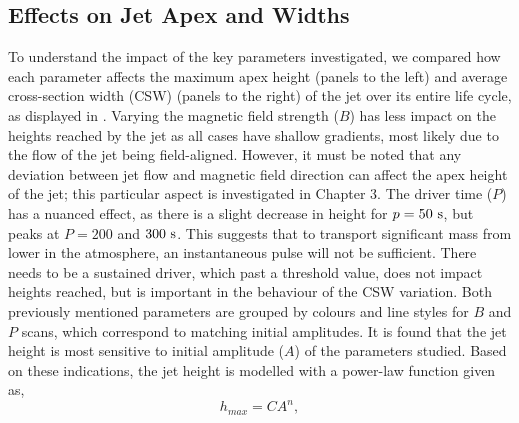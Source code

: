 \subsection{Effects on Jet Apex and Widths}
\label{subsec:jet_apex_widths}
To understand the impact of the key parameters investigated, we compared how each parameter affects the maximum apex height (panels to the left) and average cross-section width (CSW) (panels to the right) of the jet over its entire life cycle, as displayed in . Varying the magnetic field strength ($B$) has less impact on the heights reached by the jet as all cases have shallow gradients, most likely due to the flow of the jet being field-aligned. However, it must be noted that any deviation between jet flow and magnetic field direction can affect the apex height of the jet; this particular aspect is investigated in Chapter 3. The driver time ($P$) has a nuanced effect, as there is a slight decrease in height for $p=50~\rm{s}$, but peaks at $P=200$ and $300~\rm{s}$. This suggests that to transport significant mass from lower in the atmosphere, an instantaneous pulse will not be sufficient. There needs to be a sustained driver, which past a threshold value, does not impact heights reached, but is important in the behaviour of the CSW variation. Both previously mentioned parameters are grouped by colours and line styles for $B$ and $P$ scans, which correspond to matching initial amplitudes. It is found that the jet height is most sensitive to initial amplitude ($A$) of the parameters studied. Based on these indications, the jet height is modelled with a power-law function given as,  
\begin{equation}
h_{max} = C A^{n},
\end{equation}
